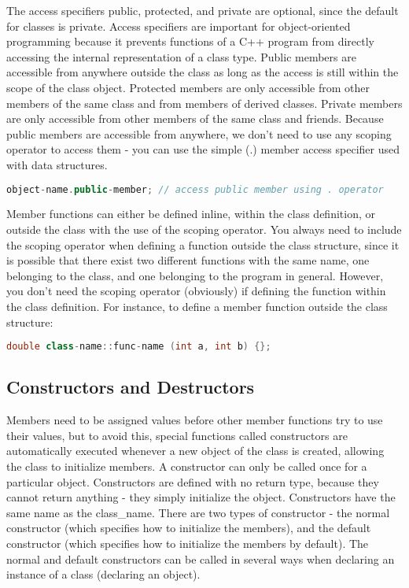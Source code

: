 \documentclass[10pt]{article}
\begin{document}
The access specifiers public, protected, and private are optional, since the default for classes is private. Access specifiers are important for object-oriented programming because it prevents functions of a C++ program from directly accessing the internal representation of a class type. Public members are accessible from anywhere outside the class as long as the access is still within the scope of the class object. Protected members are only accessible from other members of the same class and from members of derived classes. Private members are only accessible from other members of the same class and friends. Because public members are accessible from anywhere, we don't need to use any scoping operator to access them - you can use the simple (.) member access specifier used with data structures.

\begin{lstlisting}[language=C++]
object-name.public-member; // access public member using . operator
\end{lstlisting}

Member functions can either be defined inline, within the class definition, or outside the class with the use of the scoping operator. You always need to include the scoping operator when defining a function outside the class structure, since it is possible that there exist two different functions with the same name, one belonging to the class, and one belonging to the program in general. However, you don't need the scoping operator (obviously) if defining the function within the class definition. For instance, to define a member function outside the class structure:

\begin{lstlisting}[language=C++]
double class-name::func-name (int a, int b) {};
\end{lstlisting}

\subsection{Constructors and Destructors}

Members need to be assigned values before other member functions try to use their values, but to avoid this, special functions called constructors are automatically executed whenever a new object of the class is created, allowing the class to initialize members. A constructor can only be called once for a particular object. Constructors are defined with no return type, because they cannot return anything - they simply initialize the object. Constructors have the same name as the class\_name. There are two types of constructor - the normal constructor (which specifies how to initialize the members), and the default constructor (which specifies how to initialize the members by default). The normal and default constructors can be called in several ways when declaring an instance of a class (declaring an object).
\end{document}
